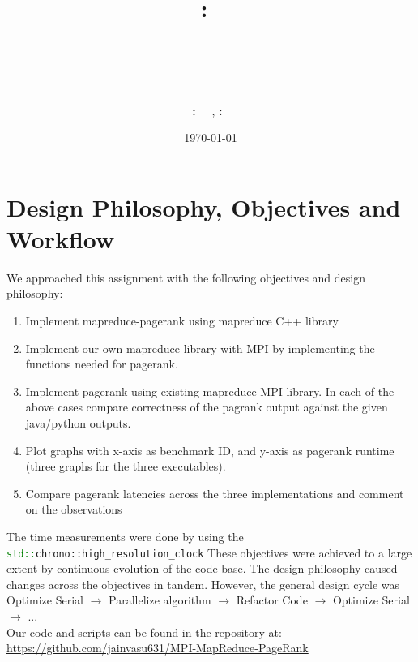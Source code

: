 \documentclass{article}
\title{
    \textmd{\hmwkClass :\ \hmwkClassTitle}\\
    \vspace{2in}
    \textmd{\textbf{\hmwkTitle}}\\
    \textmd{\hmwkSubtitle}\\
    \vspace{3in}
}
\author
{
    \textbf{\hmwkAuthorNameOne:\ \hmwkEntryNumberOne}
    \ ,
    \textbf{\hmwkAuthorNameTwo:\ \hmwkEntryNumberTwo}
}
\date{\today}
\newcommand{\cpp}{\lstinline[language=C++]}
\begin{document}
    
    \maketitle
    \clearpage
    \tableofcontents
    \clearpage
    
    \section{Design Philosophy, Objectives and Workflow}
    
    We approached this assignment with the following objectives and design philosophy:
    \begin{enumerate}
        \item Implement mapreduce-pagerank using mapreduce C++ library
        \item Implement our own mapreduce library with MPI by implementing  the functions needed for pagerank. 
        \item  Implement pagerank using existing mapreduce MPI library.
    In each of the above cases compare correctness of the pagrank output against the given java/python outputs.
        \item Plot graphs with x-axis as benchmark ID, and y-axis as pagerank runtime (three graphs for the three executables).
        \item Compare pagerank latencies across the three implementations and comment on the observations
    \end{enumerate}
    The time measurements were done by using the \cpp{std::chrono::high_resolution_clock} 
    These objectives were achieved to a large extent by continuous evolution of the code-base.
    The design philosophy caused changes across the objectives in tandem. However, the general design cycle was \\
    
    Optimize Serial $\longrightarrow$ Parallelize algorithm $\longrightarrow$ Refactor Code $\longrightarrow$ Optimize Serial $\longrightarrow$ ... \\
    
    Our code and scripts can be found in the repository at:
    {\newline}
    \url{https://github.com/jainvasu631/MPI-MapReduce-PageRank}
    
\end{document}
